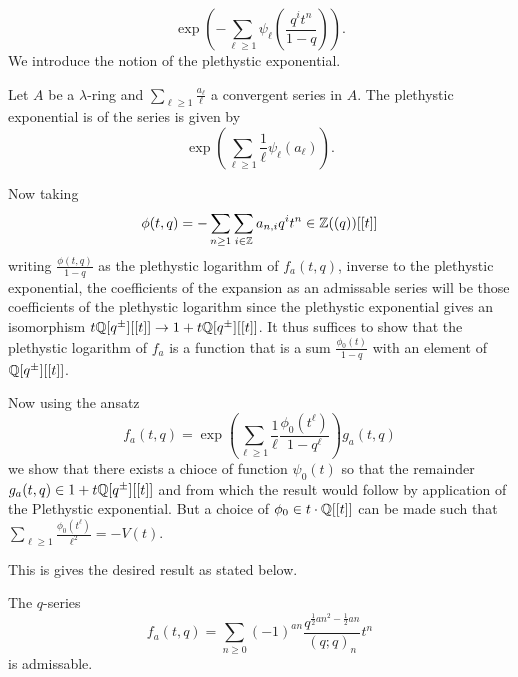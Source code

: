 \begin{equation}\label{eqn: modified Nahm sum as exponent of Adams sum}
    \exp\left(-\sum_{\ell\geq1}\psi_{\ell}\left(\frac{q^{i}t^{n}}{1-q}\right)\right).
\end{equation}
We introduce the notion of the plethystic exponential.
\begin{definition}\label{def: Plethystic exponential}
    Let $A$ be a $\lambda$-ring and $\sum_{\ell\geq 1}\frac{a_{\ell}}{\ell}$ a convergent series in $A$. The plethystic exponential is of the series is given by 
    $$\exp\left(\sum_{\ell\geq 1}\frac{1}{\ell}\psi_{\ell}(a_{\ell})\right).$$
\end{definition}
Now taking 
$$\phi(t,q)=-\sum_{n\geq1}\sum_{i\in\mathbb{Z}}a_{n,i}q^{i}t^{n}\in\mathbb{Z}((q))[[t]]$$
writing $\frac{\phi(t,q)}{1-q}$ as the plethystic logarithm of $f_{a}(t,q)$, inverse to the plethystic exponential, the coefficients of the expansion as an admissable series will be those coefficients of the plethystic logarithm since the plethystic exponential gives an isomorphism $t\mathbb{Q}[q^{\pm}][[t]]\to 1+t\mathbb{Q}[q^{\pm}][[t]]$. It thus suffices to show that the plethystic logarithm of $f_{a}$ is a function that is a sum $\frac{\phi_{0}(t)}{1-q}$ with an element of $\mathbb{Q}[q^{\pm}][[t]]$. 

Now using the ansatz
\begin{equation}\label{eqn: plethystic exponential ansatz}
    f_{a}(t,q)=\exp\left(\sum_{\ell\geq 1}\frac{1}{\ell}\frac{\phi_{0}(t^{\ell})}{1-q^{\ell}}\right)g_{a}(t,q)
\end{equation}
we show that there exists a chioce of function $\psi_{0}(t)$ so that the remainder $g_{a}(t,q)\in 1+t\mathbb{Q}[q^{\pm}][[t]]$ and from which the result would follow by application of the Plethystic exponential. But a choice of $\phi_{0}\in t\cdot\mathbb{Q}[[t]]$ can be made  such that $\sum_{\ell\geq 1}\frac{\phi_{0}(t^{\ell})}{\ell^{2}}=-V(t)$. 

This is gives the desired result as stated below. 
\begin{theorem}\label{thm: modified 1x1 Nahm sum is admissable}
    The $q$-series 
    $$f_{a}(t,q)=\sum_{n\geq0}(-1)^{an}\frac{q^{\frac{1}{2}an^{2}-\frac{1}{2}an}}{(q;q)_{n}}t^{n}$$
    is admissable. 
\end{theorem}

